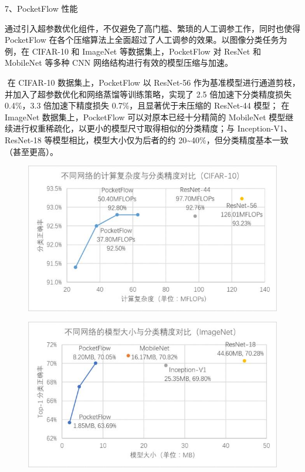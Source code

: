 7、PocketFlow 性能

​
通过引入超参数优化组件，不仅避免了高门槛、繁琐的人工调参工作，同时也使得
PocketFlow
在各个压缩算法上全面超过了人工调参的效果。以图像分类任务为例，在
CIFAR-10 和 ImageNet 等数据集上，PocketFlow 对 ResNet 和 MobileNet
等多种 CNN 网络结构进行有效的模型压缩与加速。

​ 在 CIFAR-10 数据集上，PocketFlow 以 ResNet-56
作为基准模型进行通道剪枝，并加入了超参数优化和网络蒸馏等训练策略，实现了
2.5 倍加速下分类精度损失 0.4\%，3.3 倍加速下精度损失
0.7\%，且显著优于未压缩的 ResNet-44 模型； 在 ImageNet
数据集上，PocketFlow 可以对原本已经十分精简的 MobileNet
模型继续进行权重稀疏化，以更小的模型尺寸取得相似的分类精度；与
Inception-V1、ResNet-18 等模型相比，模型大小仅为后者的约
20\textasciitilde{}40\%，但分类精度基本一致（甚至更高）。

\begin{figure}
\centering
\includegraphics{./img/ch17/packflow2.jpg}
\caption{}
\end{figure}

\begin{figure}
\centering
\includegraphics{./img/ch17/packflow3.jpg}
\caption{}
\end{figure}

